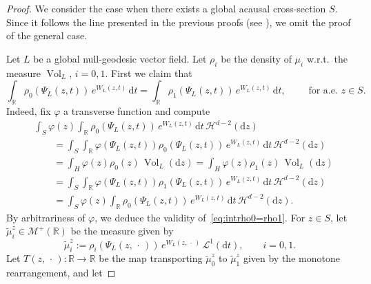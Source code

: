 \documentclass[12pt,a4paper]{amsart}
\theoremstyle{plain}
\theoremstyle{definition}
\numberwithin{equation}{section}
\newcommand{\R}{\mathbb{R}}
\DeclareMathOperator{\vol}{Vol}
\newcommand{\de}{{\mathrm{d}}}
\newcommand{\haus}{\mathcal{H}}
\newcommand{\M}{\mathcal{M}}
\newcommand{\dotargument}{\,\cdot\,}
\newcommand{\gflow}{\Psi}
\begin{document}
\begin{proof}
We consider the case when there exists a global acausal cross-section $S$.
Since it follows the line
  presented in the previous proofs (see ),  we omit the proof of the general case.

  Let  $L$ be a global null-geodesic vector field.
  Let $\rho_i$ be the density of $\mu_i$ w.r.t.\ the measure
  $\vol_L$, $i=0,1$.
  First we claim that
  \begin{equation}\label{eq:intrho0=rho1}
    \int_{\R}
    \rho_0(\gflow_L(z,t))
    \,
    e^{W_{L}(z,t)}
    \,
    \de t
    =
    \int_{\R}
    \rho_1(\gflow_L(z,t))
    \,
    e^{W_{L}(z,t)}
    \,
    \de t
    ,
    \qquad
    \text{ for a.e.\ }
    z\in S
    .
  \end{equation}
  Indeed, fix $\varphi$ a transverse function and compute
  \begin{align*}
    &
    \int_S
    \varphi(z)
    \int_{\R}
    \rho_0(\gflow_L(z,t))
    \,
    e^{W_{L}(z,t)}
    \,
    \de t
    \,
    \haus^{d-2}(\de z)
    \\
    &\qquad
    =
    \int_S
    \int_{\R}
    \varphi(\gflow_L(z,t))
    \rho_0(\gflow_L(z,t))
    \,
    e^{W_{L}(z,t)}
    \,
    \de t
    \,
    \haus^{d-2}(\de z)
    \\
    &\qquad
      =
      \int_H
      \varphi(z)
      \rho_0(z)
      \,
      \vol_L(\de z)
      =
      \int_H
      \varphi(z)
      \rho_1(z)
      \,
      \vol_L(\de z)
    \\
    &\qquad
    =
    \int_S
    \int_{\R}
    \varphi(\gflow_L(z,t))
    \rho_1(\gflow_L(z,t))
    \,
    e^{W_{L}(z,t)}
    \,
    \de t
    \,
      \haus^{d-2}(\de z)
    \\
    &\qquad
      =
    \int_S
    \varphi(z)
    \int_{\R}
    \rho_0(\gflow_L(z,t))
    \,
    e^{W_{L}(z,t)}
    \,
    \de t
    \,
      \haus^{d-2}(\de z)
      .
  \end{align*}
  By arbitrariness of $\varphi$, we deduce the validity of~\eqref{eq:intrho0=rho1}.
%
  For $z\in S$, let $\tilde\mu_i^z\in\M^+(\R)$ be the measure given by
  \begin{equation}
    \tilde\mu_i^z
    :=
    \rho_i(\gflow_L(z,\dotargument))
    \,e^{W_{L}(z,\dotargument)}
    \,
    \mathcal{L}^{1}(\de t)
    ,
    \qquad
    i=0,1
    .
  \end{equation}
  Let $T(z,\dotargument):\R\to\R$ be the map transporting $\tilde\mu_0^z$
  to $\tilde\mu_1^z$ given by the monotone rearrangement, and let

\end{proof}
\end{document}
